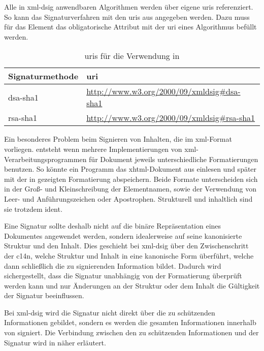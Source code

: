 Alle in \gls{xml-dsig} anwendbaren Algorithmen werden über eigene \glspl{uri} referenziert. So kann das Signaturverfahren mit den \glspl{uri} aus
 angegeben werden. Dazu muss für das Element  das obligatorische Attribut
 mit der \gls{uri} eines Algorithmus befüllt werden.

\begin{table}
    \centering
    \begin{tabularx}{\textwidth}{ l X }
        Signaturmethode & \gls{uri} \\
        \hline
        \hline
        \gls{dsa}-\gls{sha1} & \url{http://www.w3.org/2000/09/xmldsig\#dsa-sha1} \\
        \hline
        \gls{rsa}-\gls{sha1} & \url{http://www.w3.org/2000/09/xmldsig\#rsa-sha1} \\
        \hline
    \end{tabularx}
    \caption{\protect\glspl{uri} für die Verwendung in }
    \label{tab:xml-dsig-signature-method-uri}
\end{table}

Ein besonderes Problem beim Signieren von Inhalten, die im \gls{xml}-Format vorliegen. entsteht wenn mehrere Implementierungen von
\gls{xml}-Verarbeitungsprogrammen für Dokument jeweils unterschiedliche Formatierungen benutzen. So könnte ein Programm das \gls{xhtml}-Dokument aus
 einlesen und später mit der in  gezeigten Formatierung abspeichern. Beide Formate unterscheiden sich
in der Groß- und Kleinschreibung der Elementnamen, sowie der Verwendung von Leer- und Anführungszeichen oder Apostrophen. Strukturell und inhaltlich sind sie
trotzdem ident. \todo

Eine Signatur sollte deshalb nicht auf die binäre Repräsentation eines Dokumentes angewendet werden, sondern idealerweise auf seine kanonisierte
Struktur und den Inhalt. Dies geschieht bei \gls{xml-dsig} über den Zwischenschritt der \gls{c14n}, welche Struktur und Inhalt in eine kanonische Form überführt,
welche dann schließlich die zu signierenden Information bildet. Dadurch wird sichergestellt, dass die Signatur unabhängig von der Formatierung überprüft werden
kann und nur Änderungen an der Struktur oder dem Inhalt die Gültigkeit der Signatur beeinflussen. 

Bei \gls{xml-dsig} wird die Signatur nicht direkt über die zu schützenden Informationen gebildet, sondern es werden die gesamten Informationen innerhalb von
 signiert. Die Verbindung zwischen den zu schützenden Informationen und der Signatur wird in  näher erläutert.

